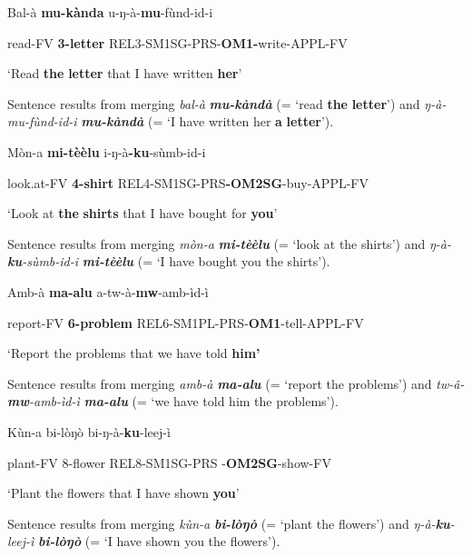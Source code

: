 \documentclass[output=paper]{langscibook}
\begin{document}
\ea%
    \label{ex:lukusa:71}
    \z

          Bal-à      \textbf{mu-kànda}     u-ŋ-à-\textbf{mu}{}-fùnd-id-i

read-FV    \textbf{3-letter}       REL3-SM1SG-PRS-\textbf{OM1-}write-APPL-FV

\glt ‘Read \textbf{the} \textbf{letter} that I have written \textbf{her}’

Sentence  results from merging \textit{bal-à} \textbf{\textit{mu-kàndà}} (= ‘read \textbf{the} \textbf{letter}’) and \textit{ŋ-à-mu-fùnd-id-i} \textbf{\textit{mu-kàndà}} (= ‘I have written her \textbf{a} \textbf{letter}’).

\ea%
    \label{ex:lukusa:72}
    \z

           Mòn-a      \textbf{mi-tèèlu}    i-ŋ-à\textbf{{}-ku}{}-sùmb-id-i  

look.at-FV    \textbf{4-shirt}    REL4-SM1SG-PRS\textbf{{}-OM2SG}{}-buy-APPL-FV  

\glt ‘Look at \textbf{the} \textbf{shirts} that I have bought for \textbf{you}’

Sentence  results from merging \textit{mòn-a} \textbf{\textit{mi-tèèlu}} (= ‘look at the shirts’) and \textit{ŋ{}-à-}\textbf{\textit{ku}}\textit{{}-sùmb-id-i} \textbf{\textit{mi-tèèlu}} (= ‘I have bought you the shirts’).

\ea%
    \label{ex:lukusa:73}
    \z

          Amb-à    \textbf{ma-alu}      a-tw-à-\textbf{mw}{}-amb-ìd-ì

report-FV  \textbf{6-problem}    REL6-SM1PL-PRS-\textbf{OM1}{}-tell-APPL-FV

\glt ‘Report the problems that we have told \textbf{him’}

Sentence  results from merging \textit{amb-à} \textbf{\textit{ma-alu}} (= ‘report the problems’) and \textit{tw-â-}\textbf{\textit{mw}}\textit{{}-amb-ìd-ì} \textbf{\textit{ma-alu}} (= ‘we have told him the problems’).

\ea%
    \label{ex:lukusa:74}
    \z

           Kùn-a      bi-lòŋò    bi-ŋ-à-\textbf{ku}{}-leej-ì

plant-FV    8-flower    REL8-SM1SG-PRS  {}-\textbf{OM2SG}{}-show-FV

\glt ‘Plant the flowers that I have shown \textbf{you}’

Sentence  results from merging \textit{kùn-a} \textbf{\textit{bi-lòŋò}} (= ‘plant the flowers’) and \textit{ŋ{}-à-}\textbf{\textit{ku}}\textit{{}-leej-ì} \textbf{\textit{bi-lòŋò}} (= ‘I have shown you the flowers’).
\end{document}
